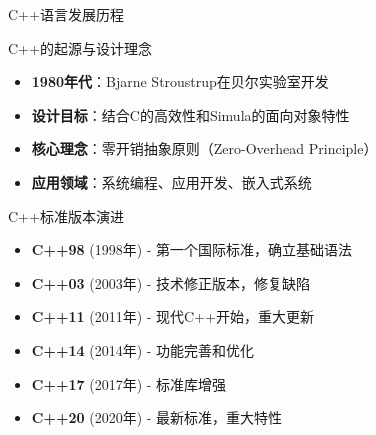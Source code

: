 \documentclass[UTF8,aspectratio=169]{beamer}
\begin{document}
\begin{frame}{C++语言发展历程}
    \begin{ytublock}{C++的起源与设计理念}
        \begin{itemize}
            \item \textbf{1980年代}：Bjarne Stroustrup在贝尔实验室开发
            \item \textbf{设计目标}：结合C的高效性和Simula的面向对象特性
            \item \textbf{核心理念}：零开销抽象原则（Zero-Overhead Principle）
            \item \textbf{应用领域}：系统编程、应用开发、嵌入式系统
        \end{itemize}
    \end{ytublock}

    \begin{ytublock}{C++标准版本演进}
        \begin{itemize}
            \item \textbf{C++98} (1998年) - 第一个国际标准，确立基础语法
            \item \textbf{C++03} (2003年) - 技术修正版本，修复缺陷
            \item \textbf{C++11} (2011年) - 现代C++开始，重大更新
            \item \textbf{C++14} (2014年) - 功能完善和优化
            \item \textbf{C++17} (2017年) - 标准库增强
            \item \textbf{C++20} (2020年) - 最新标准，重大特性
        \end{itemize}
    \end{ytublock}
\end{frame}
\end{document}
